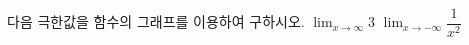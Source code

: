 다음 극한값을 함수의 그래프를 이용하여 구하시오.
 $\displaystyle\lim_{x\to\infty}3$
 $\displaystyle\lim_{x\to -\infty}\dfrac{1}{x^2}$
